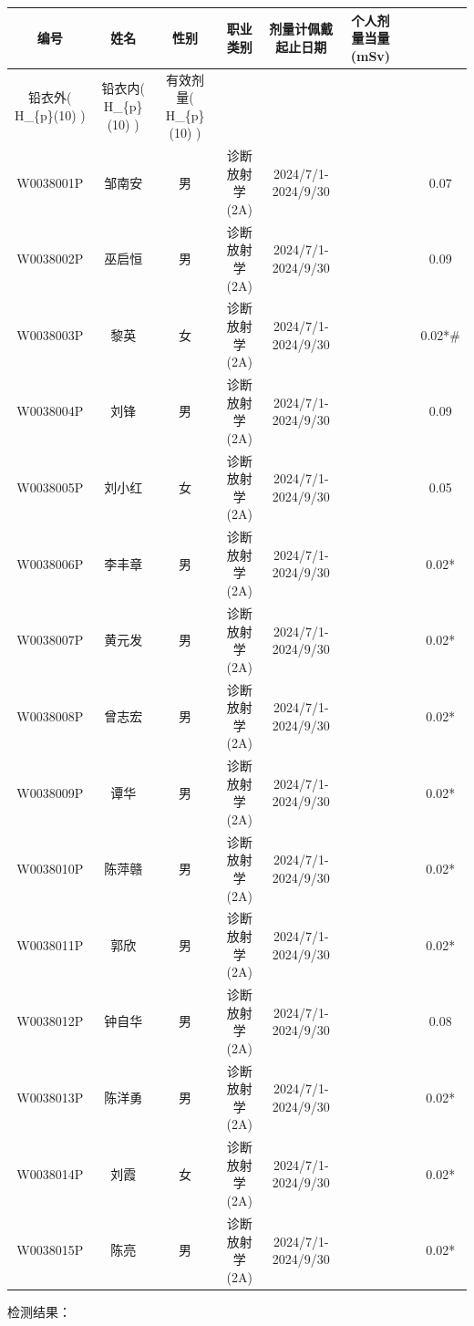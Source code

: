\begin{table}[H]
\centering
\begin{tabular}{|c|c|c|c|c|c|c|c|}
\hline
编号 & 姓名 & 性别 & 职业类别 & 剂量计佩戴起止日期 & 个人剂量当量 (mSv) &  &  \\
\hline
铅衣外( H\_\{p\}(10) ) & 铅衣内( H\_\{p\}(10) ) & 有效剂量( H\_\{p\}(10) ) &  &  &  &  &  \\
\hline
W0038001P & 邹南安 & 男 & 诊断放射学(2A) & 2024/7/1-2024/9/30 &  &  & 0.07 \\
\hline
W0038002P & 巫启恒 & 男 & 诊断放射学(2A) & 2024/7/1-2024/9/30 &  &  & 0.09 \\
\hline
W0038003P & 黎英 & 女 & 诊断放射学(2A) & 2024/7/1-2024/9/30 &  &  & 0.02*\# \\
\hline
W0038004P & 刘锋 & 男 & 诊断放射学(2A) & 2024/7/1-2024/9/30 &  &  & 0.09 \\
\hline
W0038005P & 刘小红 & 女 & 诊断放射学(2A) & 2024/7/1-2024/9/30 &  &  & 0.05 \\
\hline
W0038006P & 李丰章 & 男 & 诊断放射学(2A) & 2024/7/1-2024/9/30 &  &  & 0.02* \\
\hline
W0038007P & 黄元发 & 男 & 诊断放射学(2A) & 2024/7/1-2024/9/30 &  &  & 0.02* \\
\hline
W0038008P & 曾志宏 & 男 & 诊断放射学(2A) & 2024/7/1-2024/9/30 &  &  & 0.02* \\
\hline
W0038009P & 谭华 & 男 & 诊断放射学(2A) & 2024/7/1-2024/9/30 &  &  & 0.02* \\
\hline
W0038010P & 陈萍赣 & 男 & 诊断放射学(2A) & 2024/7/1-2024/9/30 &  &  & 0.02* \\
\hline
W0038011P & 郭欣 & 男 & 诊断放射学(2A) & 2024/7/1-2024/9/30 &  &  & 0.02* \\
\hline
W0038012P & 钟自华 & 男 & 诊断放射学(2A) & 2024/7/1-2024/9/30 &  &  & 0.08 \\
\hline
W0038013P & 陈洋勇 & 男 & 诊断放射学(2A) & 2024/7/1-2024/9/30 &  &  & 0.02* \\
\hline
W0038014P & 刘霞 & 女 & 诊断放射学(2A) & 2024/7/1-2024/9/30 &  &  & 0.02* \\
\hline
W0038015P & 陈亮 & 男 & 诊断放射学(2A) & 2024/7/1-2024/9/30 &  &  & 0.02* \\
\hline
\end{tabular}
\end{table}


检测结果：


